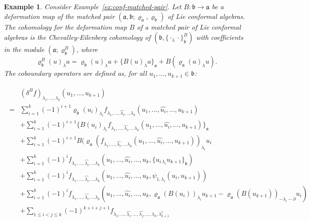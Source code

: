 \documentclass[a4paper,11pt]{article}
\def\Vs{\mathfrak{a}}
\def\Ws{\mathfrak{b}}
\def\rep{\varrho}
\def\la{\lambda}
\numberwithin{equation}{section}
\newtheorem{example}[theorem]{Example}
\begin{document}
\begin{example}\label{def:cohom-matched}
Consider Example~\ref{ex:conf-matched-pair}.  Let $B:\Ws\to\Vs$ be a
deformation map of the matched pair $(\Vs,\Ws;\rep_\Vs,\rep_\Ws)$ of
Lie conformal  algebras.  The \textit{cohomology for the deformation map
$B$ of a matched pair of Lie conformal  algebras} is the
Chevalley-Eilenberg cohomology of $(\Ws,\{\cdot_\la\cdot\}^B_\Ws)$
with coefficients in the module $(\Vs;\rep_\Ws^B)$, where
\[
  \rep_\Ws^B(u)_\la a
  = \rep_\Ws(u)_\la a + \{B(u)_\la a\}_\Vs + B(\rep_\Vs(a)_\la u).
\]
The coboundary operators are defined as,  for all $u_1,\ldots,u_{k+1}\in\Ws$:

\begin{align}\label{Coh: cohom-matched}
\begin{split}
 & (\delta^B f)_{\la_1,\ldots,\la_k}
  (u_1,\ldots,u_{k+1}) \\
 = & \sum_{i=1}^{k}(-1)^{i+1}
     \rep_\Ws(u_i)_{\la_i}
     f_{\la_1,\ldots,\widehat{\la_i},\ldots \la_k}(u_1,\ldots,\widehat{u_i},\ldots,u_{k+1})
     \\
  &+\sum_{i=1}^{k}(-1)^{i+1}
     \{B(u_i)_{\la_i}
     f_{\la_1,\ldots,\widehat{\la_i},\ldots \la_k}(u_1,\ldots,\widehat{u_i},\ldots,u_{k+1})\}_\Vs
     \\
  &+\sum_{i=1}^{k}(-1)^{i+1}
    B (\rep_\Vs(f_{\la_1,\ldots,\widehat{\la_i},\ldots \la_k}(u_1,\ldots,\widehat{u_i},\ldots,u_{k+1}))_{\la_i}u_i
     \\
  &
    + \sum_{i=1}^{k}(-1)^i
    f_{\la_1,\ldots,\widehat{\la_i},\ldots \la_k}
      (u_1,\ldots,\widehat{u_i},\ldots,u_k,
       \{u_{i\,\la_i} u_{k+1}\}_\Ws)
      \\&
    + \sum_{i=1}^{k}(-1)^i
    f_{\la_1,\ldots,\widehat{\la_i},\ldots \la_k}
      (u_1,\ldots,\widehat{u_i},\ldots,u_k,
      \psi_{1,\la_i} (u_{i}, u_{k+1}))
      \\&
    + \sum_{i=1}^{k}(-1)^i
    f_{\la_1,\ldots,\widehat{\la_i},\ldots \la_k}
      (u_1,\ldots,\widehat{u_i},\ldots,u_k,
       \rep_\Vs(B(u_i))_{\la_i}u_{k+1}-\rep_\Vs(B(u_{k+1}))_{-\la_i-\partial}u_i)
      \\
  &
    + \!\!\sum_{1\leq i<j\leq k}\!\!(-1)^{k+i+j+1}
      f_{\la_1,\ldots,\widehat{\la_i},\ldots ,\widehat{\la_j},\ldots, \la_k,\la_{k+1}^\ddag}

\end{split}
\end{align}
\end{example}
\end{document}
